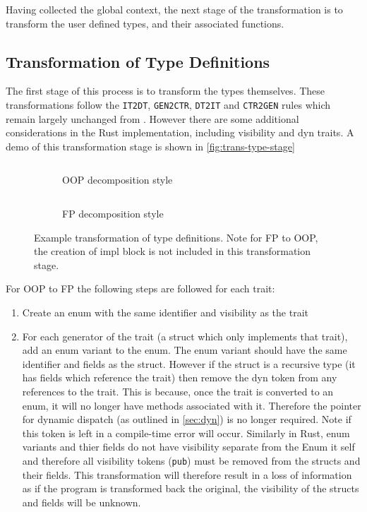\documentclass[ oneside,%
                    author={James Elgar},
                    degree={MEng},
                     title={Bidirectional transformer between functional and \\ object-oriented programming in Rust},
                  subtitle={}]{dissertation}
\newcommand{\rust}[1]{\texttt{#1}}
\newcommand{\codefile}[2]{\inputminted[xleftmargin=20pt,linenos, breaklines]{#1}{#2}}
\newcommand{\rustsnippet}[1]{\codefile{rust}{snippets/#1.rs}}
\begin{document}
Having collected the global context, the next stage of the transformation is to transform the user defined types, and their associated functions. 

\subsection{Transformation of Type Definitions}
The first stage of this process is to transform the types themselves. These transformations follow the \verb|IT2DT|, \verb|GEN2CTR|, \verb|DT2IT| and \verb|CTR2GEN| rules which remain largely unchanged from \cite{food}. However there are some additional considerations in the Rust implementation, including visibility and dyn traits. A demo of this transformation stage is shown in \autoref{fig:trans-type-stage}

\begin{figure}
\centering
\begin{subfigure}{.5\textwidth}
    \rustsnippet{type_def_transfom_oop}
    \caption{OOP decomposition style}
    \label{fig:dec-ex-oop}
\end{subfigure}%
\begin{subfigure}{.5\textwidth}
    \rustsnippet{type_def_transfom_fp}
    \caption{FP decomposition style}
    \label{fig:dec-ex-fp}
\end{subfigure}
\caption{Example transformation of type definitions. Note for FP to OOP, the creation of impl block is not included in this transformation stage.}
\label{fig:trans-type-stage}
\end{figure}

For OOP to FP the following steps are followed for each trait:
\begin{enumerate}
    \item Create an enum with the same identifier and visibility as the trait
    \item For each generator of the trait (a struct which only implements that trait), add an enum variant to the enum. The enum variant should have the same identifier and fields as the struct. However if the struct is a recursive type (it has fields which reference the trait) then remove the dyn token from any references to the trait. This is because, once the trait is converted to an enum, it will no longer have methods associated with it. Therefore the pointer for dynamic dispatch (as outlined in \autoref{sec:dyn}) is no longer required. Note if this token is left in a compile-time error will occur. 
    Similarly in Rust, enum variants and thier fields do not have visibility separate from the Enum it self and therefore all visibility tokens (\rust{pub}) must be removed from the structs and their fields. This transformation will therefore result in a loss of information as if the program is transformed back the original, the visibility of the structs and fields will be unknown.
\end{enumerate}
\end{document}
